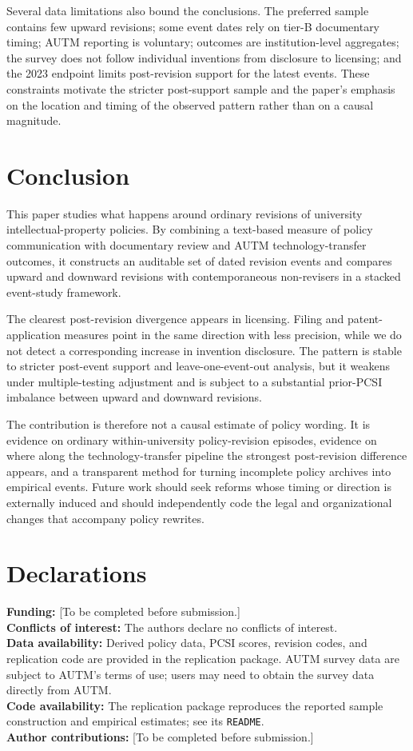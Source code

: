Several data limitations also bound the conclusions. The preferred sample contains few upward revisions; some event dates rely on tier-B documentary timing; AUTM reporting is voluntary; outcomes are institution-level aggregates; the survey does not follow individual inventions from disclosure to licensing; and the 2023 endpoint limits post-revision support for the latest events. These constraints motivate the stricter post-support sample and the paper's emphasis on the location and timing of the observed pattern rather than on a causal magnitude.

\section{Conclusion}\label{sec:conclusion}

This paper studies what happens around ordinary revisions of university intellectual-property policies. By combining a text-based measure of policy communication with documentary review and AUTM technology-transfer outcomes, it constructs an auditable set of dated revision events and compares upward and downward revisions with contemporaneous non-revisers in a stacked event-study framework.

The clearest post-revision divergence appears in licensing. Filing and patent-application measures point in the same direction with less precision, while we do not detect a corresponding increase in invention disclosure. The pattern is stable to stricter post-event support and leave-one-event-out analysis, but it weakens under multiple-testing adjustment and is subject to a substantial prior-PCSI imbalance between upward and downward revisions.

The contribution is therefore not a causal estimate of policy wording. It is evidence on ordinary within-university policy-revision episodes, evidence on where along the technology-transfer pipeline the strongest post-revision difference appears, and a transparent method for turning incomplete policy archives into empirical events. Future work should seek reforms whose timing or direction is externally induced and should independently code the legal and organizational changes that accompany policy rewrites.

\section*{Declarations}
\noindent\textbf{Funding:} [To be completed before submission.]\\
\textbf{Conflicts of interest:} The authors declare no conflicts of interest.\\
\textbf{Data availability:} Derived policy data, PCSI scores, revision codes, and replication code are provided in the replication package. AUTM survey data are subject to AUTM's terms of use; users may need to obtain the survey data directly from AUTM.\\
\textbf{Code availability:} The replication package reproduces the reported sample construction and empirical estimates; see its \texttt{README}.\\
\textbf{Author contributions:} [To be completed before submission.]
